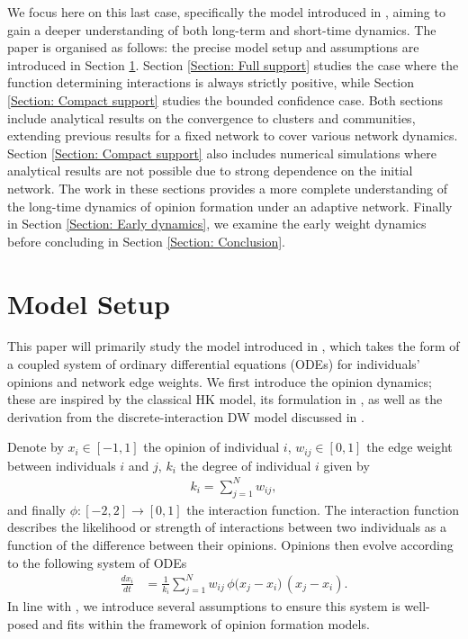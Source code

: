 \documentclass{article}
\begin{document}
We focus here on this last case, specifically the model introduced in \cite{nugent2023evolving}, aiming to gain a deeper understanding of both long-term and short-time dynamics. The paper is organised as follows: the precise model setup and assumptions are introduced in Section \ref{Section: Model setup}. Section \ref{Section: Full support} studies the case where the function determining interactions is always strictly positive, while Section \ref{Section: Compact support} studies the bounded confidence case. Both sections include analytical results on the convergence to clusters and communities, extending previous results for a fixed network to cover various network dynamics. Section \ref{Section: Compact support} also includes numerical simulations where analytical results are not possible due to strong dependence on the initial network. The work in these sections provides a more complete understanding of the long-time dynamics of opinion formation under an adaptive network. Finally in Section \ref{Section: Early dynamics}, we examine the early weight dynamics before concluding in Section \ref{Section: Conclusion}. 

\section{Model Setup} \label{Section: Model setup}

This paper will primarily study the model introduced in \cite{nugent2023evolving}, which takes the form of a coupled system of ordinary differential equations (ODEs) for individuals' opinions and network edge weights. We first introduce the opinion dynamics; these are inspired by the classical HK model, its formulation in \cite{motsch_heterophilious_2014}, as well as the derivation from the discrete-interaction DW model discussed in \cite{nugent2024bridging}. 

Denote by $x_i\in[-1,1]$ the opinion of individual $i$, $w_{ij}\in[0,1]$ the edge weight between individuals $i$ and $j$, $k_i$ the degree of individual $i$ given by 
\begin{align*}
    k_i = \sum_{j=1}^N w_{ij},
\end{align*}
and finally $\phi:[-2,2]\rightarrow[0,1]$ the interaction function. The interaction function describes the likelihood or strength of interactions between two individuals as a function of the difference between their opinions. Opinions then evolve according to the following system of ODEs
\begin{align} \label{Eqn: Opinion ODEs}
    \frac{dx_i}{dt} &= \frac{1}{k_i} \sum_{j=1}^N w_{ij}\,\phi\big(x_j - x_i\big)\,(x_j - x_i).
\end{align}
In line with \cite{nugent2023evolving}, we introduce several assumptions to ensure this system is well-posed and fits within the framework of opinion formation models. 
\end{document}
